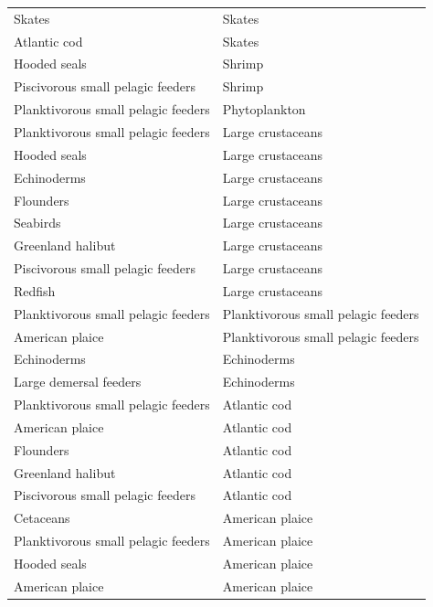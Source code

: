 \begin{singlespace}
\begin{longtable}{ p{} p{} }
    Skates                              & Skates    \\
    Atlantic cod                        & Skates    \\
    Hooded seals                        & Shrimp    \\
    Piscivorous small pelagic feeders   & Shrimp    \\
    Planktivorous small pelagic feeders & Phytoplankton \\
    Planktivorous small pelagic feeders & Large crustaceans \\
    Hooded seals                        & Large crustaceans \\
    Echinoderms                         & Large crustaceans \\
    Flounders                           & Large crustaceans \\
    Seabirds                            & Large crustaceans \\
    Greenland halibut                   & Large crustaceans \\
    Piscivorous small pelagic feeders   & Large crustaceans \\
    Redfish                             & Large crustaceans \\
    Planktivorous small pelagic feeders & Planktivorous small pelagic feeders   \\
    American plaice                     & Planktivorous small pelagic feeders   \\
    Echinoderms                         & Echinoderms   \\
    Large demersal feeders              & Echinoderms   \\
    Planktivorous small pelagic feeders & Atlantic cod  \\
    American plaice                     & Atlantic cod  \\
    Flounders                           & Atlantic cod  \\
    Greenland halibut                   & Atlantic cod  \\
    Piscivorous small pelagic feeders   & Atlantic cod  \\
    Cetaceans                           & American plaice   \\
    Planktivorous small pelagic feeders & American plaice   \\
    Hooded seals                        & American plaice   \\
    American plaice                     & American plaice   \\

\end{longtable}
\end{singlespace}

